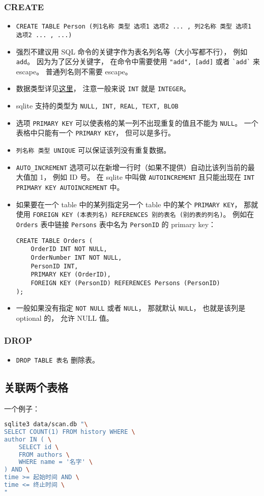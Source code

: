 \subsubsection{CREATE}
\begin{itemize}
\item \verb|CREATE TABLE Person (列1名称 类型 选项1 选项2 ... , 列2名称 类型 选项1 选项2 ... , ...)|
\item 强烈不建议用 SQL 命令的关键字作为表名列名等（大小写都不行）， 例如 \verb|add|。 因为为了区分关键字， 在命令中需要使用 \verb|"add", [add]| 或者 \verb|`add`| 来 escape。 普通列名则不需要 escape。
\item 数据类型详见\href{https://www.w3schools.com/sql/sql_datatypes.asp}{这里}， 注意一般来说 \verb|INT| 就是 \verb|INTEGER|。
\item sqlite 支持的类型为 \verb|NULL, INT, REAL, TEXT, BLOB|
\item 选项 \verb|PRIMARY KEY| 可以使表格的某一列不出现重复的值且不能为 \verb|NULL|。 一个表格中只能有一个 \verb|PRIMARY KEY|， 但可以是多行。
\item \verb|列名称 类型 UNIQUE| 可以保证该列没有重复数据。
\item \verb|AUTO_INCREMENT| 选项可以在新增一行时（如果不提供）自动比该列当前的最大值加 1， 例如 ID 号。 在 sqlite 中叫做 \verb|AUTOINCREMENT| 且只能出现在 \verb|INT PRIMARY KEY AUTOINCREMENT| 中。
\item 如果要在一个 table 中的某列指定另一个 table 中的某个 \verb|PRIMARY KEY|， 那就使用 \verb|FOREIGN KEY (本表列名) REFERENCES 别的表名 (别的表的列名)|。 例如在 \verb|Orders| 表中链接 \verb|Persons| 表中名为 \verb|PersonID| 的 primary key：
\begin{lstlisting}[language=none]
CREATE TABLE Orders (
    OrderID INT NOT NULL,
    OrderNumber INT NOT NULL,
    PersonID INT,
    PRIMARY KEY (OrderID),
    FOREIGN KEY (PersonID) REFERENCES Persons (PersonID)
);
\end{lstlisting}
\item 一般如果没有指定 \verb|NOT NULL| 或者 \verb|NULL|， 那就默认 \verb|NULL|， 也就是该列是 optional 的， 允许 NULL 值。
\end{itemize}

\subsubsection{DROP}
\begin{itemize}
\item \verb|DROP TABLE 表名| 删除表。
\end{itemize}


\subsection{关联两个表格}
一个例子：
\begin{lstlisting}[language=bash,caption=stat.sh]
sqlite3 data/scan.db "\
SELECT COUNT(1) FROM history WHERE \
author IN ( \
    SELECT id \
    FROM authors \
    WHERE name = '名字' \
) AND \
time >= 起始时间 AND \
time <= 终止时间 \
"
\end{lstlisting}
